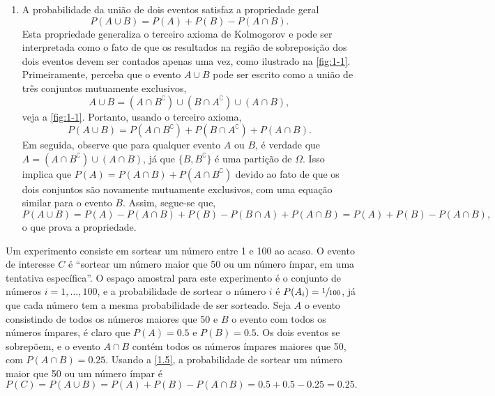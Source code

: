 \begin{enumerate}[noitemsep]
\item A probabilidade da união de dois eventos satisfaz a propriedade geral
\begin{equation}\label{1.5}
P(A \cup B) = P(A) + P(B) - P(A \cap B).
\end{equation}
Esta propriedade generaliza o terceiro axioma de Kolmogorov e pode ser interpretada como o fato de que os resultados na região de sobreposição dos dois eventos devem ser contados apenas uma vez, como ilustrado na \autoref{fig:1-1}. Primeiramente, perceba que o evento $A \cup B$ pode ser escrito como a união de três conjuntos mutuamente exclusivos,
\begin{equation*}
 A \cup B = (A \cap B^\complement) \cup (B \cap A^\complement) \cup (A \cap B),
\end{equation*}
veja a \autoref{fig:1-1}. Portanto, usando o terceiro axioma,
\begin{equation*}
 P(A \cup B) = P(A \cap B^\complement) + P(B \cap A^\complement) + P(A \cap B).
\end{equation*}
Em seguida, observe que para qualquer evento $A$ ou $B$, é verdade que $A = (A \cap B^\complement) \cup (A \cap B)$, já que $\{B, B^\complement\}$ é uma partição de $\Omega$. Isso implica que $P(A) = P(A \cap B) + P(A \cap B^\complement)$ devido ao fato de que os dois conjuntos são novamente mutuamente exclusivos, com uma equação similar para o evento  $B$. Assim, segue-se que,
\begin{equation*}
P(A \cup B) = P(A) - P(A \cap B) + P(B) - P(B \cap A) + P(A \cap B) = P(A) + P(B) - P(A \cap B),
\end{equation*}
o que prova a propriedade.
\end{enumerate}

\begin{exemplo}{}{}
Um experimento consiste em sortear um número entre 1 e 100 ao acaso. O evento de interesse $C$ é ``sortear um número maior que 50 ou um número ímpar, em uma tentativa específica''. O espaço amostral para este experimento é o conjunto de números $i = 1, \ldots, 100$, e a probabilidade de sortear o número $i$ é $P(A_i) = \sfrac{1}{100}$, já que cada número tem a mesma probabilidade de ser sorteado. Seja $A$ o evento consistindo de todos os números maiores que 50 e $B$ o evento com todos os números ímpares, é claro que $P(A) = 0.5$ e $P(B) = 0.5$. Os dois eventos se sobrepõem, e o evento $A \cap B$ contém todos os números ímpares maiores que 50, com $P(A \cap B) = 0.25$. Usando a \autoref{1.5}, a probabilidade de sortear um número maior que 50 ou um número ímpar é
\begin{equation*}
	P(C) = P(A \cup B) = P(A) + P(B) - P(A \cap B) = 0.5 + 0.5 - 0.25 = 0.25.
\end{equation*}
\end{exemplo}

